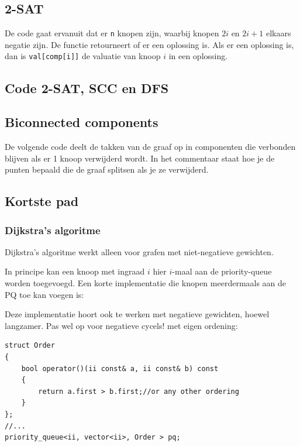 \documentclass[10pt,a4paper,titlepage]{article}
\begin{document}
\subsection{2-SAT}

De code gaat ervanuit dat er \lstinline{n} knopen zijn, waarbij knopen $2i$ en $2i+1$ elkaars negatie zijn. De functie retourneert of er een oplossing is. Als er een oplossing is, dan is \lstinline{val[comp[i]]} de valuatie van knoop $i$ in een oplossing.

\subsection{Code 2-SAT, SCC en DFS}







\subsection{Biconnected components}

De volgende code deelt de takken van de graaf op in componenten die verbonden blijven als er 1 knoop verwijderd wordt. In het commentaar staat hoe je de punten bepaald die de graaf splitsen als je ze verwijderd.



\subsection{Kortste pad}

\subsubsection{Dijkstra's algoritme}

Dijkstra's algoritme werkt alleen voor grafen met niet-negatieve gewichten.

In principe kan een knoop met ingraad $i$ hier $i$-maal aan de priority-queue worden toegevoegd. 
Een korte implementatie die knopen meerdermaals aan de PQ toe kan voegen is:

Deze implementatie hoort ook te werken met negatieve gewichten, hoewel langzamer. Pas wel op voor negatieve cycels!
met eigen ordening:
\begin{lstlisting}
struct Order
{
    bool operator()(ii const& a, ii const& b) const
    {
        return a.first > b.first;//or any other ordering
    }
};
//...
priority_queue<ii, vector<ii>, Order > pq;
\end{lstlisting}
\end{document}
